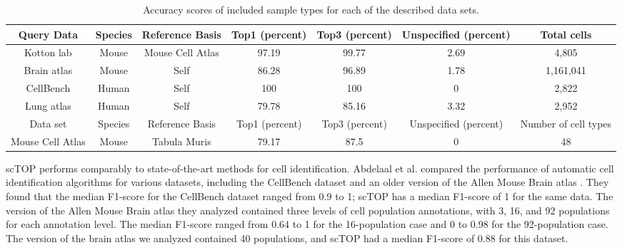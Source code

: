 \documentclass[aps,superscriptaddress, notitlepage,longbibliography]{revtex4-1}
\begin{document}
\begin{table}[h!]
\centering
\begin{tabular}{| c | c | c | c | c | c | c |}
\hline
Query Data & Species & Reference Basis & Top1 (percent) & Top3 (percent) & Unspecified (percent) & Total cells \\ 
\hline
Kotton lab & Mouse & Mouse Cell Atlas & 97.19 & 99.77 & 2.69 & 4,805 \\ 
\hline
Brain atlas & Mouse & Self & 86.28 & 96.89 & 1.78 & 1,161,041 \\
\hline
CellBench & Human & Self & 100 & 100 & 0 & 2,822 \\
\hline
Lung atlas & Human & Self & 79.78 & 85.16 & 3.32 & 2,952 \\  
\hline
\hline
Data set & Species & Reference Basis & Top1 (percent) & Top3 (percent) & Unspecified (percent) & Number of cell types \\
\hline
Mouse Cell Atlas & Mouse & Tabula Muris & 79.17 & 87.5 & 0 & 48 \\
\hline

\end{tabular}
\caption{Accuracy scores of included sample types for each of the described data sets.}
\label{table:1}
\end{table}

scTOP performs comparably to state-of-the-art methods for cell identification. Abdelaal et al. compared the performance of automatic cell identification algorithms for various datasets, including the CellBench dataset and an older version of the Allen Mouse Brain atlas \cite{abdelaal_comparison_2019}. They found that the median F1-score for the CellBench dataset ranged from 0.9 to 1; scTOP has a median F1-score of 1 for the same data. The version of the Allen Mouse Brain atlas they analyzed contained three levels of cell population annotations, with 3, 16, and 92 populations for each annotation level. The median F1-score ranged from 0.64 to 1 for the 16-population case and 0 to 0.98 for the 92-population case. The version of the brain atlas we analyzed contained 40 populations, and scTOP had a median F1-score of 0.88 for this dataset. 
\end{document}
